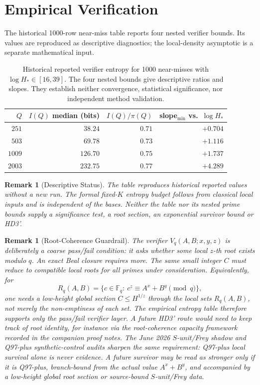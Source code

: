 \documentclass[11pt,a4paper]{article}
\newtheorem{remark}[theorem]{Remark}
\begin{document}
\section{Empirical Verification}
\label{sec:empirical}

The historical 1000-row near-miss table reports four nested
verifier bounds. Its values are reproduced as descriptive diagnostics;
the local-density asymptotic is a separate mathematical input.

\begin{table}[htb]
\centering
\begin{tabular}{rrrr}
\toprule
$Q$ & $I(Q)$ median (bits) & $I(Q)/\pi(Q)$ & slope$_{\min}$ vs.\ $\log H_*$ \\
\midrule
$251$  & $38.24$  & $0.71$ & $+0.704$ \\
$503$  & $69.78$  & $0.73$ & $+1.116$ \\
$1009$ & $126.70$ & $0.75$ & $+1.737$ \\
$2003$ & $232.75$ & $0.77$ & $+4.289$ \\
\bottomrule
\end{tabular}
\caption{Historical reported verifier entropy for 1000 near-misses with $\log H_*\in[16,39]$. The four nested bounds give descriptive ratios and slopes. They establish neither convergence, statistical significance, nor independent method validation.}
\label{tab:emp}
\end{table}

\begin{remark}[Descriptive Status]
The table reproduces historical reported values without a new run.
The formal fixed-$K$ entropy budget follows from classical local
inputs and is independent of the bases. Neither the table nor its
nested prime bounds supply a significance test, a root section,
an exponential survivor bound or HD3'.
\end{remark}

\begin{remark}[Root-Coherence Guardrail]
The verifier $V_q(A,B;x,y,z)$ is deliberately a coarse pass/fail
condition: it asks whether some local $z$-th root exists modulo $q$.
An exact Beal closure requires more. The same small integer $C$ must
reduce to compatible local roots for all primes under consideration.
Equivalently, for
\[
  R_q(A,B)=\{c\in\mathbb F_q:\ c^z\equiv A^x+B^y\pmod q\},
\]
one needs a low-height global section $C\le H^{1/z}$ through the local
sets $R_q(A,B)$, not merely the non-emptiness of each set. The empirical
entropy table therefore supports only the pass/fail verifier layer. A
future HD3' route would need to keep track of root identity, for instance via the
root-coherence capacity framework recorded in the companion proof notes.
The June 2026 $S$-unit/Frey shadow and Q97-plus synthetic-control audits
sharpen the same requirement: Q97-plus local survival alone is never
evidence. A future survivor may be read as stronger only if it is
Q97-plus, branch-bound from the actual value $A^x+B^y$, and accompanied
by a low-height global root section or source-bound $S$-unit/Frey data.
\end{remark}
\end{document}
